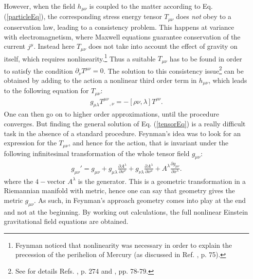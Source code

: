\documentclass{ws-procs961x669}            %
\begin{document}
However, when the field $h_{\mu\nu}$ is coupled to the matter
according to Eq.(\ref{particleEq}), the corresponding stress
energy tensor $T_{\mu\nu}$ does {\it not} obey to a conservation
law, leading to a consistency problem. This happens at variance
with electromagnetism, where Maxwell equations guarantee
conservation of the current $j^{\mu}$. Instead here $T_{\mu\nu}$
does not take into account the effect of gravity on itself, which
requires nonlinearity.\footnote{Feynman noticed that nonlinearity
was necessary in order to explain the precession of the perihelion
of Mercury (as discussed in Ref. , p.
75).} Thus a suitable $T_{\mu\nu}$ has to be found in order to
satisfy the condition $\partial_{\nu}T^{\mu\nu}=0$. The solution
to this consistency issue\footnote{See for details Refs.
, p. 274 and , pp.
78-79.} can be obtained by adding to the action a nonlinear third
order term in $h_{\mu\nu}$, which leads to the following equation
for $T_{\mu\nu}$:
%
\begin{eqnarray} \label{tensorEq}
g_{\mu\lambda} T^{\mu\nu}_{\;\;\;\;\,,\nu} =-
\left[\rho\nu,\lambda \right]T^{\rho\nu}.
\end{eqnarray}
%
One can then go on to higher order approximations, until the
procedure converges. But finding the general solution of Eq.
(\ref{tensorEq}) is a really difficult task in the absence of a
standard procedure. Feynman's idea was to look for an expression
for the $T_{\mu\nu}$, and hence for the action, that is invariant
under the following infinitesimal transformation of the whole
tensor field $g_{\mu\nu}$:
%
\begin{eqnarray} \label{infinitesimal1}
g_{\mu\nu}' = g_{\mu\nu} + g_{\mu\lambda}\frac{\partial
A^{\lambda}}{\partial x^{\nu}} + g_{\nu\lambda}\frac{\partial
A^{\lambda}}{\partial x^{\mu}} + A^{\lambda}\frac{\partial
g_{\mu\nu}}{\partial x^{\lambda}}.
\end{eqnarray}
%
where the $4-$vector $A^{\lambda}$ is the generator. This is a
geometric transformation in a Riemannian manifold with metric,
hence one can say that geometry gives the metric $g_{\mu\nu}$. As
such, in Feynman's approach geometry comes into play at the end
and not at the beginning. By working out calculations, the full
nonlinear Einstein gravitational field equations are obtained.
\end{document}
